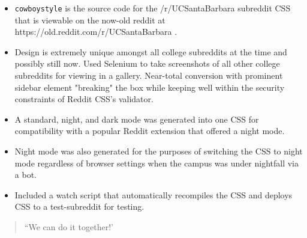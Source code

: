 \documentclass[10pt,letter,ragged2e]{altacv}
\begin{document}
\begin{paracol}{2}

\begin{itemize}
\item \texttt{cowboystyle} is the source code for the /r/UCSantaBarbara subreddit CSS that is viewable on the now-old reddit at https://old.reddit.com/r/UCSantaBarbara .
\item Design is extremely unique amongst all college subreddits at the time and possibly still now. Used Selenium to take screenshots of all other college subreddits for viewing in a gallery. Near-total conversion with prominent sidebar element "breaking" the box while keeping well within the security constraints of Reddit CSS's validator.
\item A standard, night, and dark mode was generated into one CSS for compatibility with a popular Reddit extension that offered a night mode.
\item Night mode was also generated for the purposes of switching the CSS to night mode regardless of browser settings when the campus was under nightfall via a bot.
\item Included a watch script that automatically recompiles the CSS and deploys CSS to a test-subreddit for testing.
\end{itemize}

\newpage

\switchcolumn


\begin{quote}
``We can do it together!'
\end{quote}


   

  

  


\medskip




\end{paracol}
\end{document}
